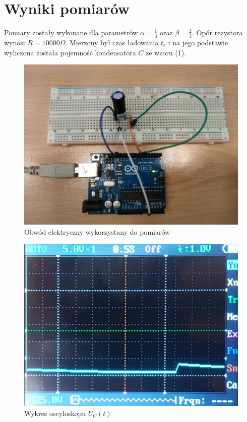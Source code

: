 \documentclass[12pt]{mwart}
\begin{document}
	\section{Wyniki pomiarów}
	\noindent Pomiary zostały wykonane dla parametrów $\alpha = \frac{1}{3} $ oraz $ \beta = \frac{2}{3} $. Opór rezystora wynosi $ R = 10 000\Omega $. Mierzony był czas ładowania $t_c$ i na jego podstawie wyliczona została pojemność kondensatora $C$ ze wzoru (1).
	\begin{figure}[H]
		\begin{center}
			\includegraphics[scale=0.12]{obwód2.jpg}
			\caption{Obwód elektryczny wykorzystany do pomiarów}
		\end{center}
	\end{figure}
	\begin{figure}[H]
		\begin{center}
			\includegraphics[scale=0.18]{wykres.jpg}
			\caption{Wykres oscyloskopu $U_C(t)$}
		\end{center}
	\end{figure}
\end{document}
